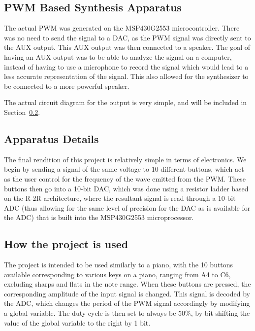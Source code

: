 \documentclass[10pt]{article}
\begin{document}
\subsection{PWM Based Synthesis Apparatus}\label{subsec:pwm-based-synthesis-apparatus}

The actual PWM was generated on the MSP430G2553 microcontroller.
There was no need to send the signal to a DAC, as the PWM signal was directly sent to the AUX output.
This AUX output was then connected to a speaker.
The goal of having an AUX output was to be able to analyze the signal on a computer, instead of having to use a microphone to record the signal which would lead to a less accurate representation of the signal.
This also allowed for the synthesizer to be connected to a more powerful speaker.

The actual circuit diagram for the output is very simple, and will be included in Section~\ref{subsec:apparatus-details}.


\subsection{Apparatus Details}\label{subsec:apparatus-details}

The final rendition of this project is relatively simple in terms of electronics.
We begin by sending a signal of the same voltage to 10 different buttons, which act as the user control for the frequency of the wave emitted from the PWM\@.
These buttons then go into a 10-bit DAC, which was done using a resistor ladder based on the R-2R architecture, where the resultant signal is read through a 10-bit ADC (thus allowing for the same level of precision for the DAC as is available for the ADC) that is built into the MSP430G2553 microprocessor. %


\subsection{How the project is used}\label{subsec:how-the-project-is-used}

The project is intended to be used similarly to a piano, with the 10 buttons available corresponding to various keys on a piano, ranging from A4 to C6, excluding sharps and flats in the note range.
When these buttons are pressed, the corresponding amplitude of the input signal is changed.
This signal is decoded by the ADC, which changes the period of the PWM signal accordingly by modifying a global variable.
The duty cycle is then set to always be 50\%, by bit shifting the value of the global variable to the right by 1 bit.
\end{document}

